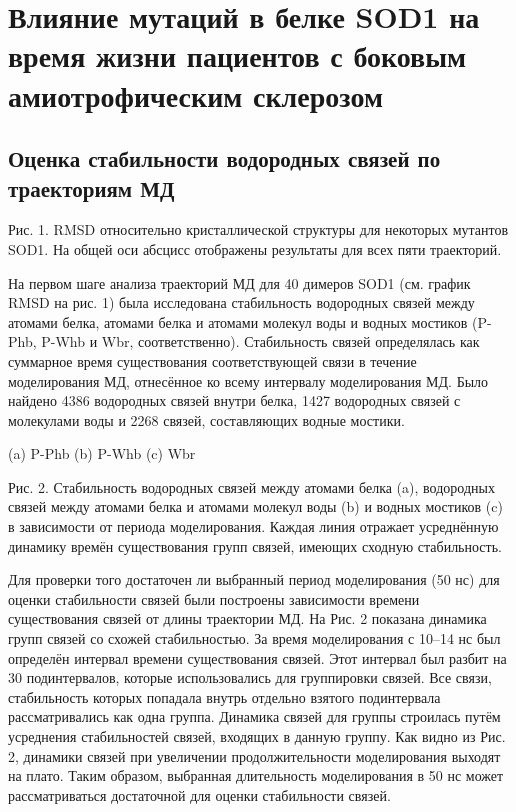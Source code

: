 \chapter{Влияние мутаций в белке SOD1 на время жизни пациентов с боковым амиотрофическим склерозом} \label{chapt3}

\section{Оценка стабильности водородных связей по траекториям МД} \label{sect_MD_hbonds}

Рис. 1. RMSD относительно кристаллической структуры для некоторых мутантов SOD1. На общей оси абсцисс отображены результаты для всех пяти траекторий.

На первом шаге анализа траекторий МД для 40 димеров SOD1 (см. график RMSD на рис. 1) была исследована стабильность  водородных связей между атомами белка, атомами белка и атомами молекул воды и водных мостиков (P-Phb, P-Whb и Wbr, соответственно). Стабильность связей определялась как суммарное время существования соответствующей связи в течение моделирования МД, отнесённое ко всему интервалу моделирования МД. Было найдено 4386 водородных связей внутри белка, 1427 водородных связей с молекулами воды и 2268 связей, составляющих водные мостики.

(a) P-Phb
(b) P-Whb
(c) Wbr

Рис. 2. Стабильность водородных связей между атомами белка (a), водородных связей между атомами белка и атомами молекул воды (b) и водных мостиков (c)  в зависимости от периода моделирования. Каждая линия отражает усреднённую динамику времён существования групп связей, имеющих сходную стабильность.

Для проверки того достаточен ли выбранный период моделирования (50 нс)  для оценки стабильности связей были построены зависимости времени существования связей от длины траектории МД. На Рис. 2 показана динамика групп связей со схожей стабильностью. За время моделирования с 10–14 нс был определён интервал времени существования связей. Этот интервал был разбит на 30 подинтервалов, которые использовались для группировки связей. Все связи, стабильность которых попадала внутрь отдельно взятого подинтервала рассматривались как одна группа. Динамика связей для группы строилась путём усреднения стабильностей связей, входящих в данную группу. Как видно из Рис.  2, динамики связей при увеличении продолжительности моделирования  выходят на плато. Таким образом, выбранная длительность моделирования в 50 нс может рассматриваться достаточной для оценки стабильности связей.

